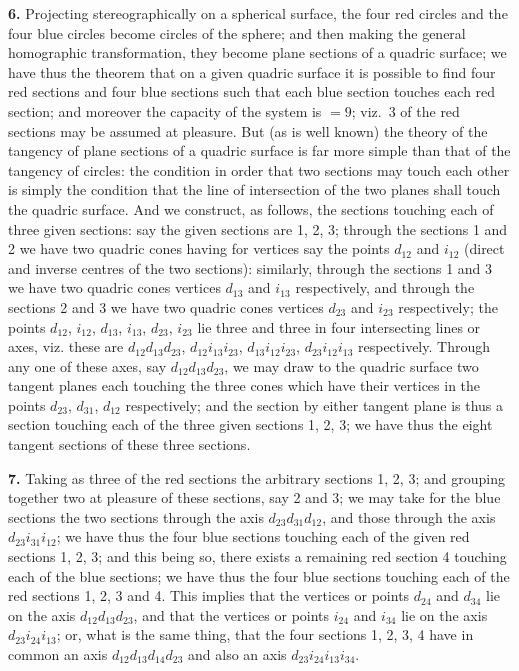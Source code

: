 \documentclass[12pt,a4paper]{article}
\begin{document}
\textbf{6.} Projecting stereographically on a spherical surface, the four red circles and the four blue circles become circles of the sphere; and then making the general homographic transformation, they become plane sections of a quadric surface; we have thus the theorem that on a given quadric surface it is possible to find four red sections and four blue sections such that each blue section touches each red section; and moreover the capacity of the system is $=9$; viz.~3 of the red sections may be assumed at pleasure. But (as is well known) the theory of the tangency of plane sections of a quadric surface is far more simple than that of the tangency of circles: the condition in order that two sections may touch each other is simply the condition that the line of intersection of the two planes shall touch the quadric surface. And we construct, as follows, the sections touching each of three given sections: say the given sections are 1, 2, 3; through the sections 1 and 2 we have two quadric cones having for vertices say the points $d_{12}$ and $i_{12}$ (direct and inverse centres of the two sections): similarly, through the sections 1 and 3 we have two quadric cones vertices $d_{13}$ and $i_{13}$ respectively, and through the sections 2 and 3 we have two quadric cones vertices $d_{23}$ and $i_{23}$ respectively; the points $d_{12}$, $i_{12}$, $d_{13}$, $i_{13}$, $d_{23}$, $i_{23}$ lie three and three in four intersecting lines or axes, viz. these are $d_{12}d_{13}d_{23}$, $d_{12}i_{13}i_{23}$, $d_{13}i_{12}i_{23}$, $d_{23}i_{12}i_{13}$ respectively. Through any one of these axes, say $d_{12}d_{13}d_{23}$, we may draw to the quadric surface two tangent planes each touching the three cones which have their vertices in the points $d_{23}$, $d_{31}$, $d_{12}$ respectively; and the section by either tangent plane is thus a section touching each of the three given sections 1, 2, 3; we have thus the eight tangent sections of these three sections.

\textbf{7.} Taking as three of the red sections the arbitrary sections 1, 2, 3; and grouping together two at pleasure of these sections, say 2 and 3; we may take for the blue sections the two sections through the axis $d_{23}d_{31}d_{12}$, and those through the axis $d_{23}i_{31}i_{12}$; we have thus the four blue sections touching each of the given red sections 1, 2, 3; and this being so, there exists a remaining red section 4 touching each of the blue sections; we have thus the four blue sections touching each of the red sections 1, 2, 3 and 4. This implies that the vertices or points $d_{24}$ and $d_{34}$ lie on the axis $d_{12}d_{13}d_{23}$, and that the vertices or points $i_{24}$ and $i_{34}$ lie on the axis $d_{23}i_{24}i_{13}$; or, what is the same thing, that the four sections 1, 2, 3, 4 have in common an axis $d_{12}d_{13}d_{14}d_{23}$ and also an axis $d_{23}i_{24}i_{13}i_{34}$.
\end{document}
